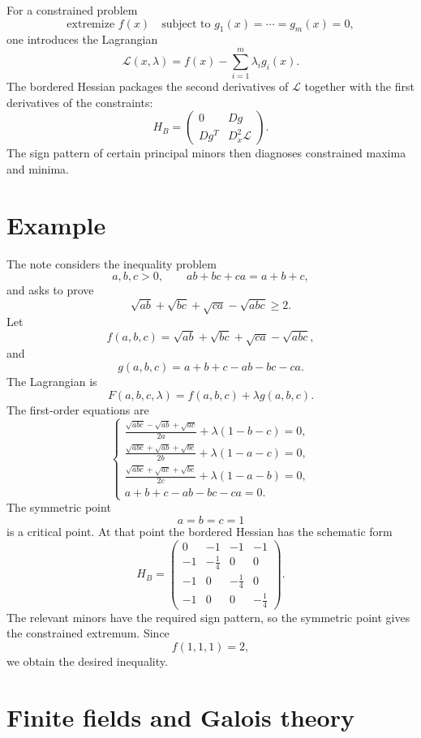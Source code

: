 For a constrained problem
\[
  \text{extremize }f(x)\quad\text{subject to }g_1(x)=\cdots=g_m(x)=0,
\]
one introduces the Lagrangian
\[
  \mathcal L(x,\lambda)=f(x)-\sum_{i=1}^m\lambda_i g_i(x).
\]
The bordered Hessian packages the second derivatives of \(\mathcal L\) together with the first derivatives of the constraints:
\[
  H_B=
  \begin{pmatrix}
  0 & Dg\\
  Dg^T & D_x^2\mathcal L
  \end{pmatrix}.
\]
The sign pattern of certain principal minors then diagnoses constrained maxima and minima.

\section{Example}

The note considers the inequality problem
\[
  a,b,c>0,\qquad ab+bc+ca=a+b+c,
\]
and asks to prove
\[
  \sqrt{ab}+\sqrt{bc}+\sqrt{ca}-\sqrt{abc}\ge2.
\]
Let
\[
  f(a,b,c)=\sqrt{ab}+\sqrt{bc}+\sqrt{ca}-\sqrt{abc},
\]
and
\[
  g(a,b,c)=a+b+c-ab-bc-ca.
\]
The Lagrangian is
\[
  F(a,b,c,\lambda)=f(a,b,c)+\lambda g(a,b,c).
\]
The first-order equations are
\[
\begin{cases}
\displaystyle \frac{\sqrt{abc}-\sqrt{ab}+\sqrt{ac}}{2a}+\lambda(1-b-c)=0,\\
\displaystyle \frac{\sqrt{abc}+\sqrt{ab}+\sqrt{bc}}{2b}+\lambda(1-a-c)=0,\\
\displaystyle \frac{\sqrt{abc}+\sqrt{ac}+\sqrt{bc}}{2c}+\lambda(1-a-b)=0,\\
a+b+c-ab-bc-ca=0.
\end{cases}
\]
The symmetric point
\[
  a=b=c=1
\]
is a critical point.  At that point the bordered Hessian has the schematic form
\[
  H_B=
  \begin{pmatrix}
  0&-1&-1&-1\\
  -1&-\frac14&0&0\\
  -1&0&-\frac14&0\\
  -1&0&0&-\frac14
  \end{pmatrix}.
\]
The relevant minors have the required sign pattern, so the symmetric point gives the constrained extremum.  Since
\[
  f(1,1,1)=2,
\]
we obtain the desired inequality.

\section{Finite fields and Galois theory}

